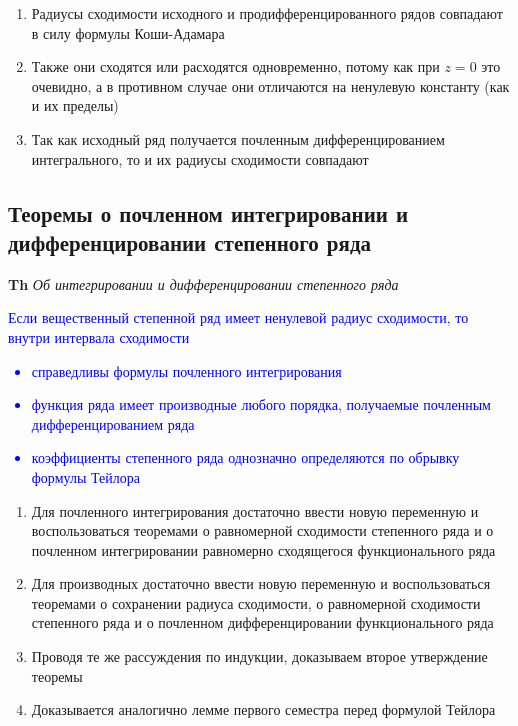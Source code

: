 \begin{enumerate}
    \item Радиусы сходимости исходного и продифференцированного рядов совпадают в силу формулы Коши-Адамара
    \item Также они сходятся или расходятся одновременно, потому как при $z = 0$ это очевидно, а в противном
    случае они отличаются на ненулевую константу (как и их пределы)
    \item Так как исходный ряд получается почленным дифференцированием интегрального, то и их радиусы сходимости
    совпадают
\end{enumerate}

\subsection{Теоремы о почленном интегрировании и дифференцировании степенного ряда}

\textbf{Th} \textit{Об интегрировании и дифференцировании степенного ряда}

\textcolor{blue}{Если вещественный степенной ряд имеет ненулевой радиус сходимости, то внутри интервала
сходимости
    \begin{itemize}
        \item справедливы формулы почленного интегрирования
        \item функция ряда имеет производные любого порядка, получаемые почленным дифференцированием ряда
        \item коэффициенты степенного ряда однозначно определяются по обрывку формулы Тейлора
    \end{itemize}   }

\begin{enumerate}
    \item Для почленного интегрирования достаточно ввести новую переменную и воспользоваться теоремами о
    равномерной сходимости степенного ряда и о почленном интегрировании равномерно сходящегося функционального ряда
    \item Для производных достаточно ввести новую переменную и воспользоваться теоремами о сохранении радиуса
    сходимости, о равномерной сходимости степенного ряда и о почленном дифференцировании функционального ряда
    \item Проводя те же рассуждения по индукции, доказываем второе утверждение теоремы
    \item Доказывается аналогично лемме первого семестра перед формулой Тейлора
\end{enumerate}

